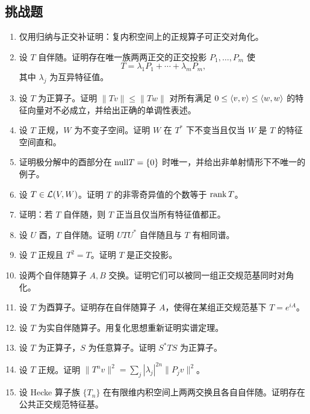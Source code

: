 \subsection*{挑战题}
\begin{enumerate}[resume, label=\textbf{\arabic*.}, leftmargin=*, itemsep=0.5em]
\item \hard 仅用归纳与正交补证明：复内积空间上的正规算子可正交对角化。
\item \hard 设 $T$ 自伴随。证明存在唯一族两两正交的正交投影 $P_1,\dots,P_m$ 使
\[
T=\lambda_1P_1+\cdots+\lambda_mP_m,
\]
其中 $\lambda_j$ 为互异特征值。
\item \hard 设 $T$ 为正算子。证明 $\|Tv\|\le \|Tw\|$ 对所有满足 $0\le \langle v, v \rangle\le \langle w, w \rangle$ 的特征向量对不必成立，并给出正确的单调性表述。
\item \hard 设 $T$ 正规，$W$ 为不变子空间。证明 $W$ 在 $T^*$ 下不变当且仅当 $W$ 是 $T$ 的特征空间直和。
\item \hard 证明极分解中的酉部分在 $\mathrm{null} T=\{0\}$ 时唯一，并给出非单射情形下不唯一的例子。
\item \hard 设 $T\in\mathcal{L}(V,W)$。证明 $T$ 的非零奇异值的个数等于 $\operatorname{rank} T$。
\item \hard 证明：若 $T$ 自伴随，则 $T$ 正当且仅当所有特征值都正。
\item \hard 设 $U$ 酉，$T$ 自伴随。证明 $UTU^*$ 自伴随且与 $T$ 有相同谱。
\item \hard 设 $T$ 正规且 $T^2=T$。证明 $T$ 是正交投影。
\item \hard 设两个自伴随算子 $A,B$ 交换。证明它们可以被同一组正交规范基同时对角化。
\item \hard 设 $T$ 为酉算子。证明存在自伴随算子 $A$，使得在某组正交规范基下 $T=e^{iA}$。
\item \hard 设 $T$ 为实自伴随算子。用复化思想重新证明实谱定理。
\item \hard 设 $T$ 为正算子，$S$ 为任意算子。证明 $S^*TS$ 为正算子。
\item \hard 设 $T$ 正规。证明 $\|T^nv\|^2=\sum_j |\lambda_j|^{2n}\|P_jv\|^2$。
\item \hard 设 Hecke 算子族 $\{T_n\}$ 在有限维内积空间上两两交换且各自自伴随。证明存在公共正交规范特征基。
\end{enumerate}

